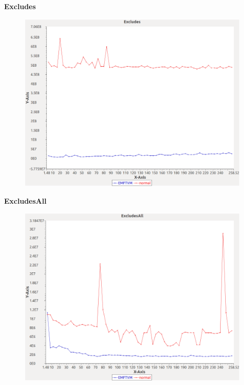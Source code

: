 \noindent\textbf{Excludes}

\begin{figure}[h]
\centering
\includegraphics[width=\textwidth]{../graphs/orderedset/Excludes}
\end{figure}
\pagebreak

\noindent\textbf{ExcludesAll}

\begin{figure}[h]
\centering
\includegraphics[width=\textwidth]{../graphs/orderedset/ExcludesAll}
\end{figure}
\pagebreak

